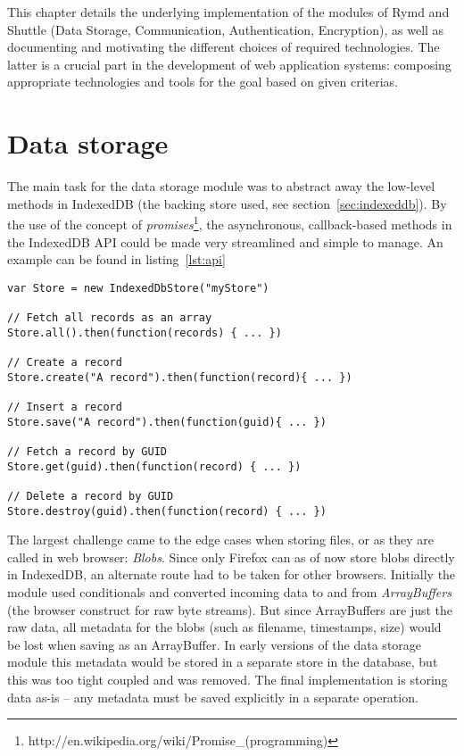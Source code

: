 This chapter details the underlying implementation of the modules of Rymd and Shuttle (Data Storage, Communication, Authentication, Encryption), as well as documenting and motivating the different choices of required technologies. The latter is a crucial part in the development of web application systems: composing appropriate technologies and tools for the goal based on given criterias.

\section{Data storage}
\label{sec:datastorage}

The main task for the data storage module was to abstract away the low-level methods in IndexedDB (the backing store used, see section~\ref{sec:indexeddb}). By the use of the concept of \emph{promises}\footnote{http://en.wikipedia.org/wiki/Promise\_(programming)}, the asynchronous, callback-based methods in the IndexedDB API could be made very streamlined and simple to manage. An example can be found in listing~\ref{lst:api}

\begin{Code}
\begin{lstlisting}[caption={Common database operations}, label={lst:api}]
var Store = new IndexedDbStore("myStore")

// Fetch all records as an array
Store.all().then(function(records) { ... })

// Create a record
Store.create("A record").then(function(record){ ... })

// Insert a record
Store.save("A record").then(function(guid){ ... })

// Fetch a record by GUID
Store.get(guid).then(function(record) { ... })

// Delete a record by GUID
Store.destroy(guid).then(function(record) { ... })
\end{lstlisting}
\end{Code}

The largest challenge came to the edge cases when storing files, or as they are called in web browser: \emph{Blobs}. Since only Firefox can as of now store blobs directly in IndexedDB, an alternate route had to be taken for other browsers. Initially the module used conditionals and converted incoming data to and from \emph{ArrayBuffers} (the browser construct for raw byte streams). But since ArrayBuffers are just the raw data, all metadata for the blobs (such as filename, timestamps, size) would be lost when saving as an ArrayBuffer. In early versions of the data storage module this metadata would be stored in a separate store in the database, but this was too tight coupled and was removed. The final implementation is storing data as-is – any metadata must be saved explicitly in a separate operation.

